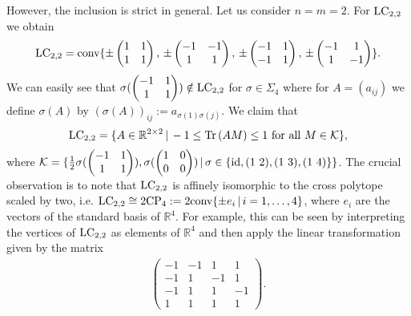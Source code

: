However, the inclusion is strict in general. Let us consider $ n=m=2 $. 
For $ \textup{LC}_{2,2} $ we obtain 
\begin{align*}
\textup{LC}_{2,2}= \textup{conv} \{ \pm \begin{pmatrix}
1 & 1 \\
1 & 1
\end{pmatrix} , \, \pm \begin{pmatrix}
-1 & -1 \\
1 & 1
\end{pmatrix} , \, \pm \begin{pmatrix}
-1 & 1 \\
-1 & 1
\end{pmatrix}, \, \pm \begin{pmatrix}
-1 & 1 \\
1 & -1
\end{pmatrix}  \}.
\end{align*}
We can easily see that $ \sigma(\begin{pmatrix}
-1 & 1 \\ 1 & 1 
\end{pmatrix}) \notin \textup{LC}_{2,2} $ for $ \sigma \in \Sigma_4 $ where for $ A = (a_{ij}) $ we define $ \sigma (A)  $ by $ (\sigma( A))_{ij}:= a_{\sigma(1)\sigma(j)} $.
We claim that
\begin{equation}\label{facetsLC}
\textup{LC}_{2,2} = \{ A \in \mathbb{R}^{2 \times 2} \, | \, -1 \le  \text{Tr} \, {(AM)}  \le 1 \textup{ for all } M \in \mathcal{K} \},
\end{equation}
where $ \mathcal{K}  = \{ \frac{1}{2}\sigma(\begin{pmatrix}
-1 & 1 \\
1 & 1
\end{pmatrix}), \sigma(\begin{pmatrix}
1 & 0 \\
0 & 0
\end{pmatrix}) \, | \,  \sigma \in \{ \textup{id}, (1 \, \, 2), (1 \, \, 3), (1 \, \, 4) \} \} $.
The crucial observation is to note that $ \textup{LC}_{2,2} $ is affinely isomorphic to the cross polytope scaled  by two, i.e. 
$ \textup{LC}_{2,2} \cong 2\textup{CP}_4 := 2\textup{conv} \{  \pm e_i \, | \, i = 1,\hdots,4 \} $, where $ e_i $ are the vectors of the standard basis of $ \mathbb{R}^4 $. For example, this can be seen by interpreting the vertices of $ \textup{LC}_{2,2} $ as elements of $ \mathbb{R}^4 $ and then apply the linear transformation given by the matrix 
\begin{align*}
\begin{pmatrix}
-1 & -1 & 1 & 1 \\
-1 & 1 & -1 & 1 \\
-1 & 1 & 1 & -1 \\
1 & 1 & 1 & 1 
\end{pmatrix}.
\end{align*}
